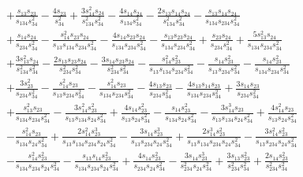 \begin{align}
  & + \frac{s_{13}s_{23}}{s_{134}s_{34}^2} - \frac{4s_{23}}{s_{34}^2} + \frac{3s_{14}^2s_{24}}{s_{134}^2s_{34}^2} - \frac{4s_{14}s_{24}}{s_{134}s_{34}^2} - \frac{2s_{13}s_{14}s_{24}}{s_{134}^2s_{34}^2} - \frac{s_{13}s_{14}s_{24}}{s_{134}s_{234}s_{34}^2} \nonumber \\
  & + \frac{s_{14}s_{24}}{s_{234}s_{34}^2} - \frac{s_{14}^2s_{23}s_{24}}{s_{13}s_{134}s_{234}s_{34}^2} - \frac{4s_{14}s_{23}s_{24}}{s_{134}s_{234}s_{34}^2} - \frac{s_{13}s_{23}s_{24}}{s_{134}s_{234}s_{34}^2} + \frac{s_{23}s_{24}}{s_{234}s_{34}^2} + \frac{5s_{13}^2s_{24}}{s_{134}s_{234}s_{34}^2} \nonumber \\
  & + \frac{3s_{13}^2s_{24}}{s_{134}^2s_{34}^2} - \frac{2s_{13}s_{23}s_{24}}{s_{234}^2s_{34}^2} - \frac{3s_{14}s_{23}s_{24}}{s_{234}^2s_{34}^2} - \frac{s_{14}^2s_{23}^2}{s_{13}s_{134}s_{234}s_{34}^2} - \frac{s_{14}s_{23}^2}{s_{13}s_{234}s_{34}^2} - \frac{s_{14}s_{23}^2}{s_{134}s_{234}s_{34}^2} \nonumber \\
  & + \frac{3s_{23}^2}{s_{234}s_{34}^2} - \frac{s_{14}^2s_{23}}{s_{13}s_{234}s_{34}^2} - \frac{s_{14}^2s_{23}}{s_{134}s_{234}s_{34}^2} - \frac{4s_{13}s_{23}}{s_{234}s_{34}^2} - \frac{4s_{13}s_{14}s_{23}}{s_{134}s_{234}s_{34}^2} + \frac{3s_{14}s_{23}}{s_{234}s_{34}^2} \nonumber \\
  & + \frac{s_{13}^2s_{23}}{s_{134}s_{234}s_{34}^2} - \frac{3s_{14}^2s_{23}^2}{s_{13}s_{134}s_{24}s_{34}^2} + \frac{4s_{14}s_{23}^2}{s_{13}s_{24}s_{34}^2} - \frac{s_{14}s_{23}^2}{s_{134}s_{24}s_{34}^2} - \frac{3s_{14}^3s_{23}}{s_{13}s_{134}s_{24}s_{34}^2} + \frac{4s_{14}^2s_{23}}{s_{13}s_{24}s_{34}^2} \nonumber \\
  & - \frac{s_{14}^2s_{23}}{s_{134}s_{24}s_{34}^2} + \frac{2s_{14}^2s_{23}^3}{s_{13}s_{134}s_{234}s_{24}s_{34}^2} - \frac{3s_{14}s_{23}^3}{s_{13}s_{234}s_{24}s_{34}^2} + \frac{2s_{14}^3s_{23}^2}{s_{13}s_{134}s_{234}s_{24}s_{34}^2} - \frac{3s_{14}^2s_{23}^2}{s_{13}s_{234}s_{24}s_{34}^2} \nonumber \\
  & - \frac{s_{14}^2s_{23}^2}{s_{134}s_{234}s_{24}s_{34}^2} - \frac{s_{13}s_{14}s_{23}^2}{s_{134}s_{234}s_{24}s_{34}^2} + \frac{4s_{14}s_{23}^2}{s_{234}s_{24}s_{34}^2} - \frac{3s_{14}s_{23}^3}{s_{234}^2s_{24}s_{34}^2} + \frac{3s_{13}s_{23}^2}{s_{234}^2s_{34}^2} + \frac{2s_{14}s_{23}^2}{s_{234}^2s_{34}^2}
\end{align}
